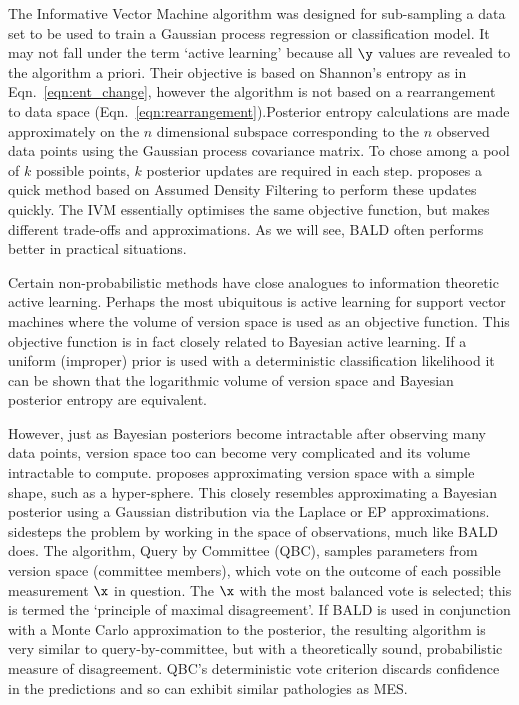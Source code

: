 The Informative Vector Machine \citep[IVM,][]{Lawrence2004} algorithm was designed for sub-sampling a data set to be used to train a Gaussian process regression or classification model. It may not fall under the term `active learning' because all $\y$ values are revealed to the algorithm a priori. Their objective is based on Shannon's entropy as in Eqn.\ \eqref{eqn:ent_change}, however the algorithm is not based on a rearrangement to data space (Eqn.\ \eqref{eqn:rearrangement}).Posterior entropy calculations are made approximately on the $n$ dimensional subspace corresponding to the $n$ observed data points using the Gaussian process covariance matrix. To chose among a pool of $k$ possible points, $k$ posterior updates are required in each step. \citep{Lawrence2004} proposes a quick method based on Assumed Density Filtering to perform these updates quickly. The IVM essentially optimises the same objective function, but makes different trade-offs and approximations. As we will see, BALD often performs better in practical situations.

Certain non-probabilistic methods have close analogues to information theoretic active learning. Perhaps the most ubiquitous is active learning for support vector machines \citep[SVM,][]{Tong2002,seung1992} where the volume of version space is used as an objective function. This objective function is in fact closely related to Bayesian active learning. If a uniform (improper) prior is used with a deterministic classification likelihood it can be shown that the logarithmic volume of version space and Bayesian posterior entropy are equivalent.

However, just as Bayesian posteriors become intractable after observing many data points, version space too can become very complicated and its volume intractable to compute. \citep{Tong2002} proposes approximating version space with a simple shape, such as a hyper-sphere. This closely resembles approximating a Bayesian posterior using a Gaussian distribution via the Laplace or EP approximations. \citep{seung1992} sidesteps the problem by working in the space of observations, much like BALD does. The algorithm, Query by Committee (QBC), samples parameters from version space (committee members), which vote on the outcome of each possible measurement $\x$ in question. The $\x$ with the most balanced vote is selected; this is termed the `principle of maximal disagreement'. If BALD is used in conjunction with a Monte Carlo approximation to the posterior, the resulting algorithm is very similar to query-by-committee, but with a theoretically sound, probabilistic measure of disagreement. QBC's deterministic vote criterion discards confidence in the predictions and so can exhibit similar pathologies as MES.

